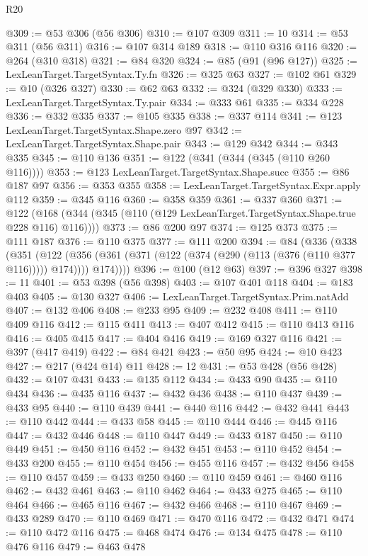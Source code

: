 \begin{lexlean}{R20}
\begin{coremodule}
@309 := @53 @306 (@56 @306)
@310 := @107 @309
@311 := 10
@314 := @53 @311 (@56 @311)
@316 := @107 @314 @189
@318 := @110 @316 @116
@320 := @264 (@310 @318)
@321 := @84 @320
@324 := @85 (@91 (@96 @127))
@325 := LexLeanTarget.TargetSyntax.Ty.fn
@326 := @325 @63
@327 := @102 @61
@329 := @10 (@326 @327)
@330 := @62 @63
@332 := @324 (@329 @330)
@333 := LexLeanTarget.TargetSyntax.Ty.pair
@334 := @333 @61
@335 := @334 @228
@336 := @332 @335
@337 := @105 @335
@338 := @337 @114
@341 := @123 LexLeanTarget.TargetSyntax.Shape.zero @97
@342 := LexLeanTarget.TargetSyntax.Shape.pair
@343 := @129 @342
@344 := @343 @335
@345 := @110 @136
@351 := @122 (@341 (@344 (@345 (@110 @260 @116))))
@353 := @123 LexLeanTarget.TargetSyntax.Shape.succ
@355 := @86 @187 @97
@356 := @353 @355
@358 := LexLeanTarget.TargetSyntax.Expr.apply @112
@359 := @345 @116
@360 := @358 @359
@361 := @337 @360
@371 := @122 (@168 (@344 (@345 (@110 (@129 LexLeanTarget.TargetSyntax.Shape.true @228 @116) @116))))
@373 := @86 @200 @97
@374 := @125 @373
@375 := @111 @187
@376 := @110 @375
@377 := @111 @200
@394 := @84
    (@336
      (@338
        (@351
          (@122
            (@356 (@361 (@371 (@122 (@374 (@290 (@113 (@376 (@110 @377 @116))))) @174))))
            @174))))
@396 := @100 (@12 @63)
@397 := @396 @327
@398 := 11
@401 := @53 @398 (@56 @398)
@403 := @107 @401 @118
@404 := @183 @403
@405 := @130 @327
@406 := LexLeanTarget.TargetSyntax.Prim.natAdd
@407 := @132 @406
@408 := @233 @95
@409 := @232 @408
@411 := @110 @409 @116
@412 := @115 @411
@413 := @407 @412
@415 := @110 @413 @116
@416 := @405 @415
@417 := @404 @416
@419 := @169 @327 @116
@421 := @397 (@417 @419)
@422 := @84 @421
@423 := @50 @95
@424 := @10 @423
@427 := @217 (@424 @14) @11
@428 := 12
@431 := @53 @428 (@56 @428)
@432 := @107 @431
@433 := @135 @112
@434 := @433 @90
@435 := @110 @434
@436 := @435 @116
@437 := @432 @436
@438 := @110 @437
@439 := @433 @95
@440 := @110 @439
@441 := @440 @116
@442 := @432 @441
@443 := @110 @442
@444 := @433 @58
@445 := @110 @444
@446 := @445 @116
@447 := @432 @446
@448 := @110 @447
@449 := @433 @187
@450 := @110 @449
@451 := @450 @116
@452 := @432 @451
@453 := @110 @452
@454 := @433 @200
@455 := @110 @454
@456 := @455 @116
@457 := @432 @456
@458 := @110 @457
@459 := @433 @250
@460 := @110 @459
@461 := @460 @116
@462 := @432 @461
@463 := @110 @462
@464 := @433 @275
@465 := @110 @464
@466 := @465 @116
@467 := @432 @466
@468 := @110 @467
@469 := @433 @289
@470 := @110 @469
@471 := @470 @116
@472 := @432 @471
@474 := @110 @472 @116
@475 := @468 @474
@476 := @134 @475
@478 := @110 @476 @116
@479 := @463 @478

\end{coremodule}
\end{lexlean}
